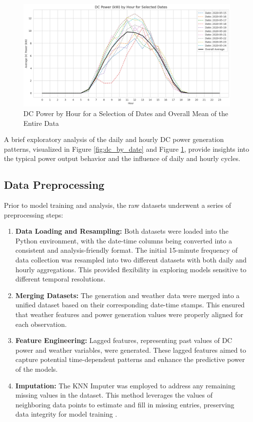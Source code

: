 \begin{figure}[!htpb]
    \centering
    \includegraphics[width=\linewidth]{Figures/dc_by_hour_f.png}
    \caption{DC Power by Hour for a Selection of Dates and Overall Mean of the Entire Data}
    \label{fig:dc_by_hour}
\end{figure}

A brief exploratory analysis of the daily and hourly DC power generation patterns, visualized in Figure \ref{fig:dc_by_date} and Figure \ref{fig:dc_by_hour}, provide insights into the typical power output behavior and the influence of daily and hourly cycles.

\subsection{Data Preprocessing}

Prior to model training and analysis, the raw datasets underwent a series of preprocessing steps:

\begin{enumerate}
   \item \textbf{Data Loading and Resampling:} Both datasets were loaded into the Python environment, with the date-time columns being converted into a consistent and analysis-friendly format. The initial 15-minute frequency of data collection was resampled into two different datasets with both daily and hourly aggregations. This provided flexibility in exploring models sensitive to different temporal resolutions.
   \item \textbf{Merging Datasets:} The generation and weather data were merged into a unified dataset based on their corresponding date-time stamps. This ensured that weather features and power generation values were properly aligned for each observation.
   \item \textbf{Feature Engineering:} Lagged features, representing past values of DC power and weather variables, were generated. These lagged features aimed to capture potential time-dependent patterns and enhance the predictive power of the models.
   \item \textbf{Imputation:} The KNN Imputer was employed to address any remaining missing values in the dataset. This method leverages the values of neighboring data points to estimate and fill in missing entries, preserving data integrity for model training \citep{Batista_2003}.
\end{enumerate} 

